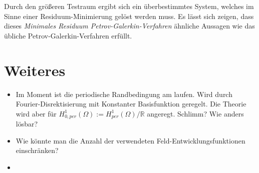 Durch den größeren Testraum ergibt sich ein überbestimmtes System, welches im Sinne einer Residuum-Minimierung gelöst werden muss. Es lässt sich zeigen, dass dieses \emph{Minimales Residuum Petrov-Galerkin-Verfahren} ähnliche Aussagen wie das übliche Petrov-Galerkin-Verfahren erfüllt.


\section{Weiteres} %
\label{sec:weiteres}

\begin{itemize}
    \item Im Moment ist die periodische Randbedingung am laufen. Wird durch Fourier-Disrektisierung mit Konstanter Basisfunktion geregelt. Die Theorie wird aber für $H^{1}_{0, per}(\Omega) := H^{1}_{per}(\Omega) / \mathbb{R}$ angeregt. Schlimm? Wie anders lösbar?
    \item Wie könnte man die Anzahl der verwendeten Feld-Entwicklungsfunktionen einschränken?
    \item
\end{itemize}

